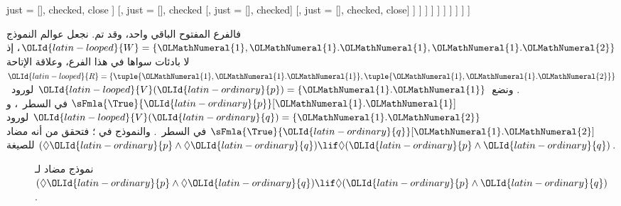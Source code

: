 \documentclass[../../../include/open-logic-section]{subfiles}
\begin{document}
{\begin{ex}
\begin{oltableau}
                        just = {\TRule{\False}{\land}[]}, checked, close
                      ]
                      [,
                        just = {\TRule{\False}{\land}[]}, checked
                        [,
                          just = {\TRule{\False}{\land}[]}, checked]
                        [,
                          just = {\TRule{\False}{\land}[]}, checked, close]
                      ]
                    ]
                  ]
                ]
              ]
            ]
          ]
        ]
      ]
    ]
  \end{oltableau}
  فالفرع المفتوح الباقي واحد، وقد تم. نجعل عوالم النموذج
  ${\OLId{latin-looped}{W}} = \{{\OLMathNumeral{1}}, {\OLMathNumeral{1}}.{\OLMathNumeral{1}}, {\OLMathNumeral{1}}.{\OLMathNumeral{2}}\}$، إذ لا بادئات سواها في هذا الفرع،
  وعلاقة الإتاحة
  ${\OLId{latin-looped}{R}} = \{\tuple{{\OLMathNumeral{1}}, {\OLMathNumeral{1}}.{\OLMathNumeral{1}}}, \tuple{{\OLMathNumeral{1}}, {\OLMathNumeral{1}}.{\OLMathNumeral{2}}}\}$.
  ونضع~${\OLId{latin-looped}{V}}({\OLId{latin-ordinary}{p}}) =
  \{{\OLMathNumeral{1}}.{\OLMathNumeral{1}}\}$ لورود~$\sFmla{\True}{{\OLId{latin-ordinary}{p}}}[{\OLMathNumeral{1}}.{\OLMathNumeral{1}}]$ في السطر~،
  و${\OLId{latin-looped}{V}}({\OLId{latin-ordinary}{q}}) = \{{\OLMathNumeral{1}}.{\OLMathNumeral{2}}\}$ لورود
  $\sFmla{\True}{{\OLId{latin-ordinary}{q}}}[{\OLMathNumeral{1}}.{\OLMathNumeral{2}}]$ في السطر~. والنموذج في
  ؛ فتحقق من أنه مضاد للصيغة
  $(\Diamond {\OLId{latin-ordinary}{p}} \land \Diamond {\OLId{latin-ordinary}{q}}) \lif \Diamond ({\OLId{latin-ordinary}{p}} \land {\OLId{latin-ordinary}{q}})$.
  \begin{figure}
  \begin{center}
  \end{center}
  \caption{نموذج مضاد لـ$(\Diamond {\OLId{latin-ordinary}{p}} \land \Diamond {\OLId{latin-ordinary}{q}}) \lif
    \Diamond ({\OLId{latin-ordinary}{p}} \land {\OLId{latin-ordinary}{q}})$.}
\end{figure}
\end{ex}          
}
\end{document}
